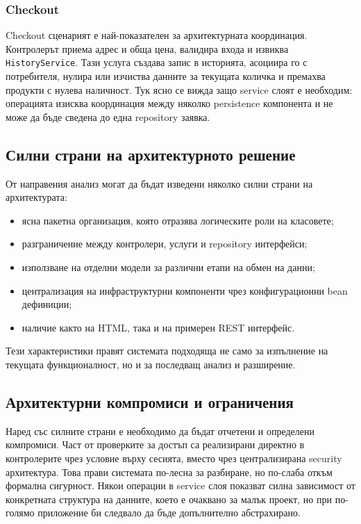 \subsubsection{Checkout}

Checkout сценарият е най-показателен за архитектурната координация. Контролерът приема адрес и обща цена, валидира входа и извиква \texttt{HistoryService}. Тази услуга създава запис в историята, асоциира го с потребителя, нулира или изчиства данните за текущата количка и премахва продукти с нулева наличност. Тук ясно се вижда защо service слоят е необходим: операцията изисква координация между няколко persistence компонента и не може да бъде сведена до една repository заявка.

\subsection{Силни страни на архитектурното решение}

От направения анализ могат да бъдат изведени няколко силни страни на архитектурата:

\begin{itemize}[leftmargin=*]
    \item ясна пакетна организация, която отразява логическите роли на класовете;
    \item разграничение между контролери, услуги и repository интерфейси;
    \item използване на отделни модели за различни етапи на обмен на данни;
    \item централизация на инфраструктурни компоненти чрез конфигурационни bean дефиниции;
    \item наличие както на HTML, така и на примерен REST интерфейс.
\end{itemize}

Тези характеристики правят системата подходяща не само за изпълнение на текущата функционалност, но и за последващ анализ и разширение.

\subsection{Архитектурни компромиси и ограничения}

Наред със силните страни е необходимо да бъдат отчетени и определени компромиси. Част от проверките за достъп са реализирани директно в контролерите чрез условие върху сесията, вместо чрез централизирана security архитектура. Това прави системата по-лесна за разбиране, но по-слаба откъм формална сигурност. Някои операции в service слоя показват силна зависимост от конкретната структура на данните, което е очаквано за малък проект, но при по-голямо приложение би следвало да бъде допълнително абстрахирано.

